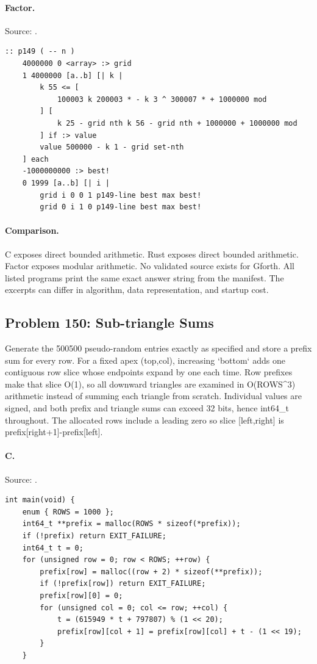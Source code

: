 \paragraph{Factor.} Source: .
\begin{lstlisting}
:: p149 ( -- n )
    4000000 0 <array> :> grid
    1 4000000 [a..b] [| k |
        k 55 <= [
            100003 k 200003 * - k 3 ^ 300007 * + 1000000 mod
        ] [
            k 25 - grid nth k 56 - grid nth + 1000000 + 1000000 mod
        ] if :> value
        value 500000 - k 1 - grid set-nth
    ] each
    -1000000000 :> best!
    0 1999 [a..b] [| i |
        grid i 0 0 1 p149-line best max best!
        grid 0 i 1 0 p149-line best max best!
\end{lstlisting}

\paragraph{Comparison.}
C exposes direct bounded arithmetic. Rust exposes direct bounded arithmetic. Factor exposes modular arithmetic.
No validated source exists for Gforth.
All listed programs print the same exact answer string from the manifest. The excerpts can differ in algorithm, data representation, and startup cost.

\subsection{Problem 150: Sub-triangle Sums}
\label{walkthrough:p150}
Generate the 500500 pseudo-random entries exactly as specified and store a prefix sum for every row. For a fixed apex (top,col), increasing `bottom` adds one contiguous row slice whose endpoints expand by one each time. Row prefixes make that slice O(1), so all downward triangles are examined in O(ROWS\textasciicircum{}3) arithmetic instead of summing each triangle from scratch. Individual values are signed, and both prefix and triangle sums can exceed 32 bits, hence int64\_t throughout. The allocated rows include a leading zero so slice [left,right] is prefix[right+1]-prefix[left].

\paragraph{C.} Source: .
\begin{lstlisting}
int main(void) {
    enum { ROWS = 1000 };
    int64_t **prefix = malloc(ROWS * sizeof(*prefix));
    if (!prefix) return EXIT_FAILURE;
    int64_t t = 0;
    for (unsigned row = 0; row < ROWS; ++row) {
        prefix[row] = malloc((row + 2) * sizeof(**prefix));
        if (!prefix[row]) return EXIT_FAILURE;
        prefix[row][0] = 0;
        for (unsigned col = 0; col <= row; ++col) {
            t = (615949 * t + 797807) % (1 << 20);
            prefix[row][col + 1] = prefix[row][col] + t - (1 << 19);
        }
    }
\end{lstlisting}

